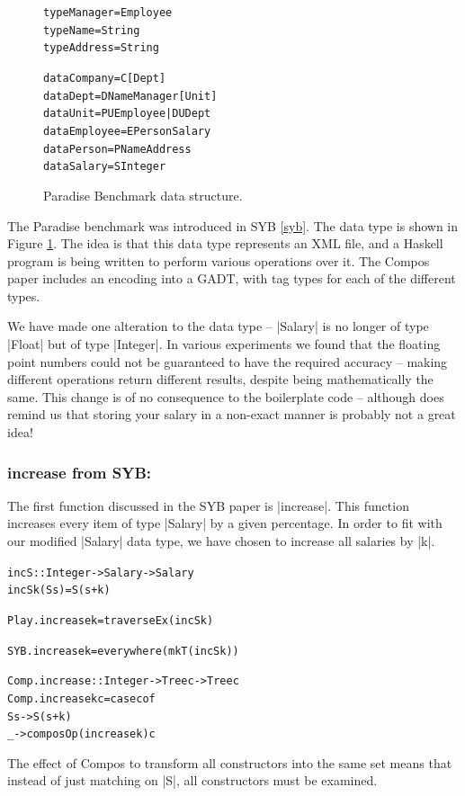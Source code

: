 \documentclass[preprint]{sigplanconf}
\newenvironment{code}{\begin{alltt}\small}{\end{alltt}}
\newcommand{\compare}[2]{\subsubsection*{\textsf{#1} from #2:}\vspace{-1ex}}
\begin{document}
\begin{figure}
\begin{code}
type Manager   = Employee
type Name      = String
type Address   = String

data Company   = C [Dept]
data Dept      = D Name Manager [Unit]
data Unit      = PU Employee | DU Dept
data Employee  = E Person Salary
data Person    = P Name Address
data Salary    = S Integer
\end{code}
\caption{Paradise Benchmark data structure.}
\label{fig:paradise}
\end{figure}

The Paradise benchmark was introduced in SYB \ref{syb}. The data type is shown in Figure \ref{fig:paradise}. The idea is that this data type represents an XML file, and a Haskell program is being written to perform various operations over it. The Compos paper includes an encoding into a GADT, with tag types for each of the different types.

We have made one alteration to the data type -- |Salary| is no longer of type |Float| but of type |Integer|. In various experiments we found that the floating point numbers could not be guaranteed to have the required accuracy -- making different operations return different results, despite being mathematically the same. This change is of no consequence to the boilerplate code -- although does remind us that storing your salary in a non-exact manner is probably not a great idea!

\compare{increase}{SYB}

The first function discussed in the SYB paper is |increase|. This function increases every item of type |Salary| by a given percentage. In order to fit with our modified |Salary| data type, we have chosen to increase all salaries by |k|.

\begin{code}
incS :: Integer -> Salary -> Salary
incS k (S s) = S (s + k)

Play.increase k = traverseEx (incS k)

SYB.increase k = everywhere (mkT (incS k))

Comp.increase :: Integer -> Tree c -> Tree c
Comp.increase k c = case c of
    S s -> S (s + k)
    _ -> composOp (increase k) c
\end{code}

The effect of Compos to transform all constructors into the same set means that instead of just matching on |S|, all constructors must be examined.
\end{document}
